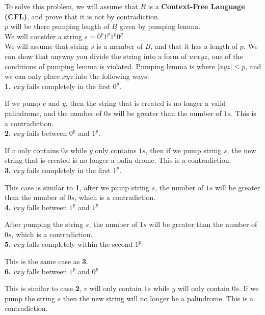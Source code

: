 \documentclass[12pt]{article}
\begin{document}
To solve this problem, we will assume that $B$ is a \textbf{Context-Free Language (CFL)},
and prove that it is not by contradiction. \\ 

$p$ will be there pumping length of $B$ given by pumping lemma. \\
We will consider a string $s = 0^p 1^p 1^p 0^p$ \\

We will assume that string $s$ is a member of $B$, and that it has
a length of $p$. We can show that anyway you divide the string into
a form of $uvxyz$, one of the conditions of pumping lemma is violated.
Pumping lemma is where $|xyz| \le p$, and we can only place $xyz$ into
the following ways: \\

\textbf{1.} $vxy$ fails completely in the first $0^p$.

If we pump $v$ and $y$, then the string that is created is no
longer a valid palindrome, and the number of $0s$ will be greater
than the number of $1s$. This is a contradiction. \\
	
\textbf{2.} $vxy$ fails between $0^p$ and $1^p$.

If $v$ only contains $0s$ while $y$ only contains $1s$, then
if we pump string $s$, the new string that is created is no
longer a palin drome. This is a contradiction. \\
	
\textbf{3.} $vxy$ fails completely in the first $1^p$.

This case is similar to \textbf{1}, after we pump string $s$,
the number of $1s$ will be greater than the number of $0s$,
which is a contradiction. \\

\textbf{4.} $vxy$ falls between $1^p$ and $1^p$

After pumping the string $s$, the number of $1s$ will be greater
than the number of $0s$, which is a contradiction. \\

\textbf{5.} $vxy$ falls completely within the second $1^p$

This is the same case as \textbf{3}. \\

\textbf{6.} $vxy$ falls between $1^p$ and $0^p$

This is similar to case \textbf{2}, $v$ will only contain
$1s$ while $y$ will only contain $0s$. If we pump the string
$s$ then the new string will no longer be a palindrome.
This is a contradiction. \\
\end{document}
